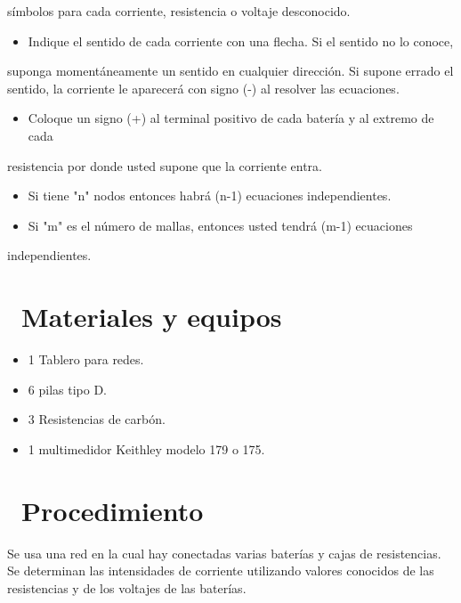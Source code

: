 \documentclass[11pt,a4paper]{article}
\newcommand{\iconotexto}[2]{\textcolor{cyanNeon}{\faIcon{#1}}~#2}
\begin{document}
símbolos para cada corriente, resistencia o voltaje desconocido.

\begin{itemize}[leftmargin=1.4em,itemsep=2pt,topsep=3pt]
  \item Indique el sentido de cada corriente con una flecha. Si el sentido no lo conoce,
\end{itemize}

suponga momentáneamente un sentido en cualquier dirección. Si supone errado el sentido, la corriente le aparecerá con signo (-) al resolver las ecuaciones.

\begin{itemize}[leftmargin=1.4em,itemsep=2pt,topsep=3pt]
  \item Coloque un signo (+) al terminal positivo de cada batería y al extremo de cada
\end{itemize}

resistencia por donde usted supone que la corriente entra.

\begin{itemize}[leftmargin=1.4em,itemsep=2pt,topsep=3pt]
  \item Si tiene "n" nodos entonces habrá (n-1) ecuaciones independientes.
  \item Si "m" es el número de mallas, entonces usted tendrá (m-1) ecuaciones
\end{itemize}

independientes.

\section{\iconotexto{box-open}{Materiales y equipos}}

\begin{itemize}[leftmargin=1.4em,itemsep=2pt,topsep=3pt]
  \item 1 Tablero para redes.
  \item 6 pilas tipo D.
  \item 3 Resistencias de carbón.
  \item 1 multimedidor Keithley modelo 179 o 175.
\end{itemize}

\section{\iconotexto{list-ol}{Procedimiento}}

Se usa una red en la cual hay conectadas varias baterías y cajas de resistencias. Se determinan las intensidades de corriente utilizando valores conocidos de las resistencias y de los voltajes de las baterías.
\end{document}
